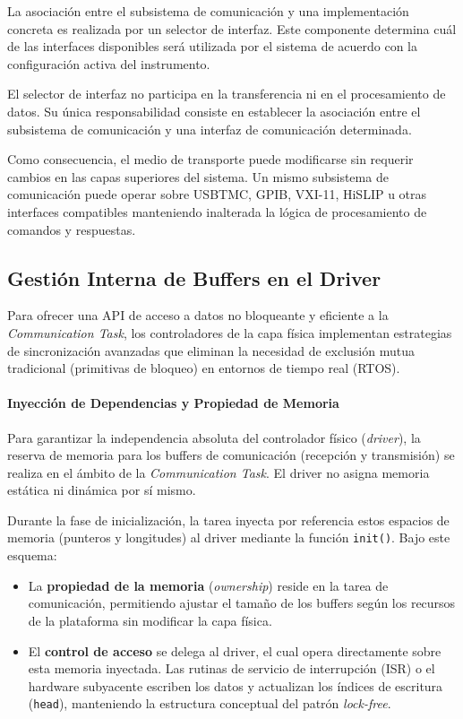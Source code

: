 La asociación entre el subsistema de comunicación y una implementación concreta es realizada por un selector de interfaz. Este componente determina cuál de las interfaces disponibles será utilizada por el sistema de acuerdo con la configuración activa del instrumento.

El selector de interfaz no participa en la transferencia ni en el procesamiento de datos. Su única responsabilidad consiste en establecer la asociación entre el subsistema de comunicación y una interfaz de comunicación determinada.

Como consecuencia, el medio de transporte puede modificarse sin requerir cambios en las capas superiores del sistema. Un mismo subsistema de comunicación puede operar sobre USBTMC, GPIB, VXI-11, HiSLIP u otras interfaces compatibles manteniendo inalterada la lógica de procesamiento de comandos y respuestas.

\subsection{Gestión Interna de Buffers en el Driver}
\label{subsec:lock-free-buffers}

Para ofrecer una API de acceso a datos no bloqueante y eficiente a la \textit{Communication Task}, los controladores de la capa física implementan estrategias de sincronización avanzadas que eliminan la necesidad de exclusión mutua tradicional (primitivas de bloqueo) en entornos de tiempo real (RTOS).

\paragraph{Inyección de Dependencias y Propiedad de Memoria}

Para garantizar la independencia absoluta del controlador físico (\textit{driver}), la reserva de memoria para los buffers de comunicación (recepción y transmisión) se realiza en el ámbito de la \textit{Communication Task}. El driver no asigna memoria estática ni dinámica por sí mismo.

Durante la fase de inicialización, la tarea inyecta por referencia estos espacios de memoria (punteros y longitudes) al driver mediante la función \texttt{init()}. Bajo este esquema:
\begin{itemize}
    \item La \textbf{propiedad de la memoria} (\textit{ownership}) reside en la tarea de comunicación, permitiendo ajustar el tamaño de los buffers según los recursos de la plataforma sin modificar la capa física.
    \item El \textbf{control de acceso} se delega al driver, el cual opera directamente sobre esta memoria inyectada. Las rutinas de servicio de interrupción (ISR) o el hardware subyacente escriben los datos y actualizan los índices de escritura (\texttt{head}), manteniendo la estructura conceptual del patrón \textit{lock-free}.
\end{itemize}

